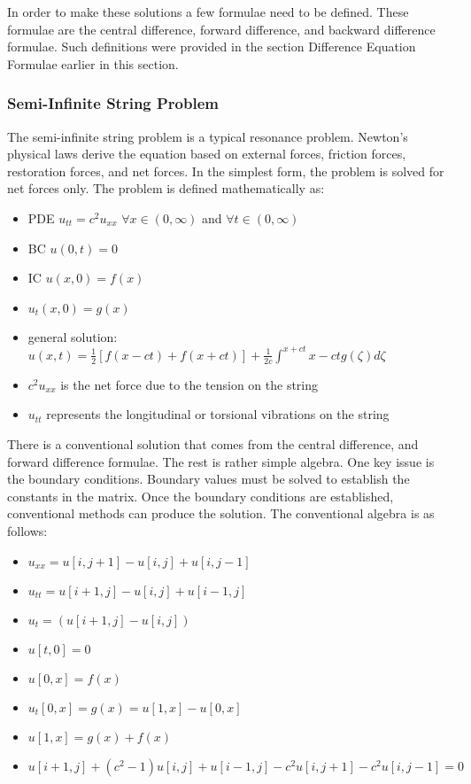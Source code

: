 In order to make these solutions a few formulae need to be defined.  These formulae are the central difference, forward difference, and backward difference formulae.   Such definitions were provided in the section Difference Equation Formulae earlier in this section.  


\subsubsection {Semi-Infinite String Problem}
The semi-infinite string problem is a typical resonance problem.  Newton's physical laws derive the equation based on external forces, friction forces, restoration forces, and net forces.   In the simplest form, the problem is solved for net forces only.  %
The problem is defined mathematically as:

\begin{itemize}
\item PDE $u_{tt} = c^2 u_{xx}$  $\forall x \in (0, \infty)$ and $\forall t \in (0,\infty)$ 
\item BC $u(0,t) = 0$
\item IC $u(x,0)= f(x)$
\item $u_t (x,0) = g(x)$
\item general solution: $ u(x,t) = \frac{1}{2} [ f(x-ct) + f(x+ct)] + \frac{1}{2c} \int ^{x+ct}{x-ct} g(\zeta) d\zeta$
\item $c^2 u_{xx} $ is the net force due to the tension on the string
\item $u_{tt}$  represents the longitudinal or torsional vibrations on the string
\end{itemize}

There is a conventional solution that comes from the central difference, and forward difference formulae.  The rest is rather simple algebra.  One key issue is the boundary conditions.  Boundary values must %
be solved to establish the constants in the matrix.  Once the boundary conditions %
are established, %
conventional methods can produce the solution.   The conventional algebra is as follows:

\begin{itemize}
\item $u_{xx} = u[i,j+1] - u[i,j] + u[i,j-1] $
\item $u_{tt} = u[i+1,j] - u[i,j] + u[i-1,j] $
\item $u_t = (u[i+1,j] - u[i,j]) $
\item $u[t,0] = 0 $
\item $u[0,x] = f(x) $
\item $u_t [0,x] = g(x) = u [1, x] - u[0,x] $
\item $u[1,x] = g(x) + f(x) $
\item $ u[i+1,j] + (c^2 - 1)u[i,j] + u[i-1,j] - c^2u[i,j+1]  - c^2 u[i,j-1] = 0 $
\end{itemize}



